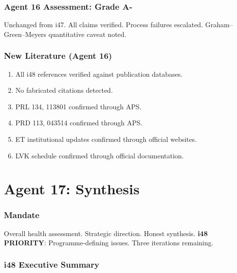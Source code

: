 \documentclass[11pt,a4paper]{article}
\begin{document}
\section{Agent 16 Assessment: Grade A-}

Unchanged from i47. All claims verified. Process failures escalated. Graham--Green--Meyers quantitative caveat noted.

\section{New Literature (Agent 16)}

\begin{enumerate}
\item All i48 references verified against publication databases.
\item No fabricated citations detected.
\item PRL 134, 113801 confirmed through APS.
\item PRD 113, 043514 confirmed through APS.
\item ET institutional updates confirmed through official websites.
\item LVK schedule confirmed through official documentation.
\end{enumerate}


\part{Agent 17: Synthesis}
\label{part:agent17}

\section{Mandate}

Overall health assessment. Strategic direction. Honest synthesis. \textbf{i48 PRIORITY}: Programme-defining issues. Three iterations remaining.

\section{i48 Executive Summary}
\end{document}
